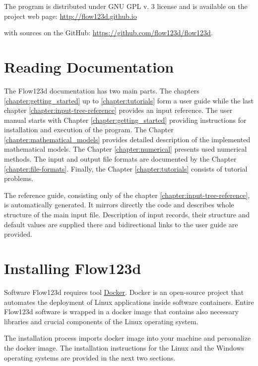 \documentclass[12pt,a4paper]{report}
\begin{document}
The program is distributed under GNU GPL v. 3 license and is available on the project web page:
\url{http://flow123d.github.io}

with sources on the GitHub:
\url{https://github.com/flow123d/flow123d}.


\section{Reading Documentation}
The Flow123d documentation has two main parts. The chapters \ref{chapter:getting_started} up to \ref{chapter:tutorials} 
form a user guide while the last chapter \ref{chapter:input-tree-reference} provides an input reference.
The user manual starts with Chapter \ref{chapter:getting_started} providing instructions for installation and execution of the program.
The Chapter \ref{chapter:mathematical_models} provides detailed description of the implemented mathematical models.
The Chapter \ref{chapter:numerical} presents used numerical methods. The input and output file formats are documented by the Chapter 
\ref{chapter:file-formats}. Finally, the Chapter \ref{chapter:tutorials}  consists of tutorial problems.

The reference guide, consisting only of the chapter \ref{chapter:input-tree-reference}, is automatically
generated. It mirrors directly the code and describes whole structure of the main input file. Description
of input records, their structure and default values are supplied there and bidirectional links to the user 
guide are provided.


\section{Installing Flow123d}
Software Flow123d requires tool \href{https://www.docker.com}{Docker}. 
Docker is an open-source project that automates the deployment of Linux applications inside software containers. 
Entire Flow123d software is wrapped in a docker image that contains also necessary libraries and crucial components 
of the Linux operating system.

The installation process imports docker image into your machine and personalize the docker image. The installation 
instructions for the Linux and the Windows operating systems are provided in the next two sections.
\end{document}
